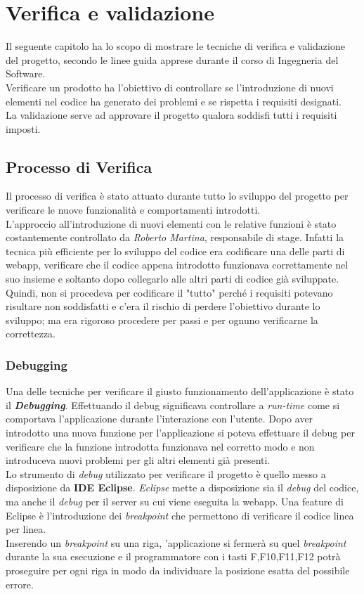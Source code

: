 \chapter{Verifica e validazione}
\label{cap:verifica-validazione}

Il seguente capitolo ha lo scopo di mostrare le tecniche di verifica e validazione del progetto, secondo le linee guida apprese durante il corso di Ingegneria del Software. \\
Verificare un prodotto ha l'obiettivo di controllare se l'introduzione di nuovi elementi nel codice ha generato dei problemi e se rispetta i requisiti designati. 
\\La validazione serve ad approvare il progetto qualora soddisfi tutti i requisiti imposti.

\section{Processo di Verifica}
Il processo di verifica è stato attuato durante tutto lo sviluppo del progetto per verificare le nuove funzionalità e comportamenti introdotti.\\
L'approccio all'introduzione di nuovi elementi con le relative funzioni è stato costantemente controllato da \textit{Roberto Martina}, responsabile di stage. Infatti  la tecnica più efficiente per lo sviluppo del codice era codificare una delle parti di webapp, verificare che il codice appena introdotto funzionava correttamente nel suo insieme e soltanto dopo collegarlo alle altri parti di codice già sviluppate.\\
Quindi, non si procedeva per codificare il "tutto" perché i requisiti potevano risultare non soddisfatti e c'era il rischio di perdere l'obiettivo durante lo sviluppo; ma era rigoroso procedere per passi e per ognuno verificarne la correttezza.

\subsection{Debugging}
Una delle tecniche per verificare il giusto funzionamento dell'applicazione è stato il \textit{\textbf{Debugging}}. Effettuando il debug significava controllare a \textit{run-time} come si comportava l'applicazione durante l'interazione con l'utente. Dopo aver introdotto una nuova funzione per l'applicazione si poteva effettuare il debug per verificare che la funzione introdotta funzionava nel corretto modo e non introduceva nuovi problemi per gli altri elementi già presenti. \\
Lo strumento di \textit{debug} utilizzato per verificare il progetto è quello messo a disposizione da \textbf{IDE Eclipse}. \textit{Eclipse} mette a disposizione sia il \textit{debug} del codice, ma anche il \textit{debug} per il server su cui viene eseguita la webapp.
Una feature di Eclipse è l'introduzione dei \textit{breakpoint} che permettono di verificare il codice linea per linea.\\ Inserendo un \textit{breakpoint} su una riga, 'applicazione si fermerà su quel \textit{breakpoint} durante la sua esecuzione e il programmatore con i tasti F,F10,F11,F12 potrà proseguire per ogni riga in modo da individuare la posizione esatta del possibile errore.

